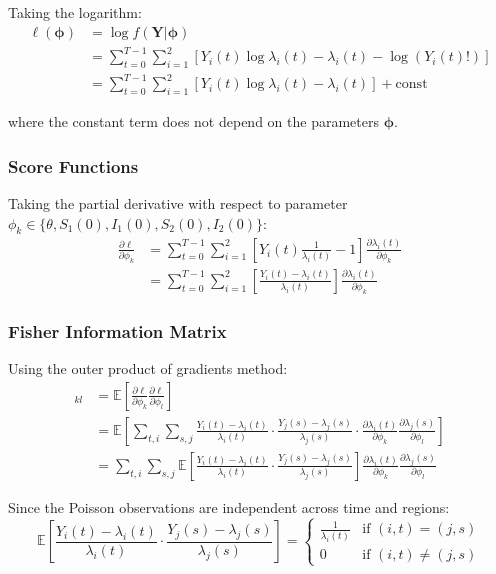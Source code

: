 Taking the logarithm:
\begin{align}
\ell(\boldsymbol{\phi}) &= \log f(\mathbf{Y}|\boldsymbol{\phi}) \\
&= \sum_{t=0}^{T-1} \sum_{i=1}^{2} [Y_i(t) \log \lambda_i(t) - \lambda_i(t) - \log(Y_i(t)!)] \\
&= \sum_{t=0}^{T-1} \sum_{i=1}^{2} [Y_i(t) \log \lambda_i(t) - \lambda_i(t)] + \text{const}
\end{align}

where the constant term does not depend on the parameters $\boldsymbol{\phi}$.

\subsubsection{Score Functions}

Taking the partial derivative with respect to parameter $\phi_k \in \{\theta, S_1(0), I_1(0), S_2(0), I_2(0)\}$:
\begin{align}
\frac{\partial \ell}{\partial \phi_k} &= \sum_{t=0}^{T-1} \sum_{i=1}^{2} \left[Y_i(t) \frac{1}{\lambda_i(t)} - 1\right] \frac{\partial \lambda_i(t)}{\partial \phi_k} \\
&= \sum_{t=0}^{T-1} \sum_{i=1}^{2} \left[\frac{Y_i(t) - \lambda_i(t)}{\lambda_i(t)}\right] \frac{\partial \lambda_i(t)}{\partial \phi_k}
\end{align}

\subsubsection{Fisher Information Matrix}

Using the outer product of gradients method:
\begin{align}
[\mathbf{J}]_{kl} &= \mathbb{E}\left[\frac{\partial \ell}{\partial \phi_k}\frac{\partial \ell}{\partial \phi_l}\right] \\
&= \mathbb{E}\left[\sum_{t,i} \sum_{s,j} \frac{Y_i(t) - \lambda_i(t)}{\lambda_i(t)} \cdot \frac{Y_j(s) - \lambda_j(s)}{\lambda_j(s)} \cdot \frac{\partial \lambda_i(t)}{\partial \phi_k}\frac{\partial \lambda_j(s)}{\partial \phi_l}\right] \\
&= \sum_{t,i} \sum_{s,j} \mathbb{E}\left[\frac{Y_i(t) - \lambda_i(t)}{\lambda_i(t)} \cdot \frac{Y_j(s) - \lambda_j(s)}{\lambda_j(s)}\right] \frac{\partial \lambda_i(t)}{\partial \phi_k}\frac{\partial \lambda_j(s)}{\partial \phi_l}
\end{align}

Since the Poisson observations are independent across time and regions:
\begin{equation}
\mathbb{E}\left[\frac{Y_i(t) - \lambda_i(t)}{\lambda_i(t)} \cdot \frac{Y_j(s) - \lambda_j(s)}{\lambda_j(s)}\right] = \begin{cases}
\frac{1}{\lambda_i(t)} & \text{if } (i,t) = (j,s) \\
0 & \text{if } (i,t) \neq (j,s)
\end{cases}
\end{equation}

